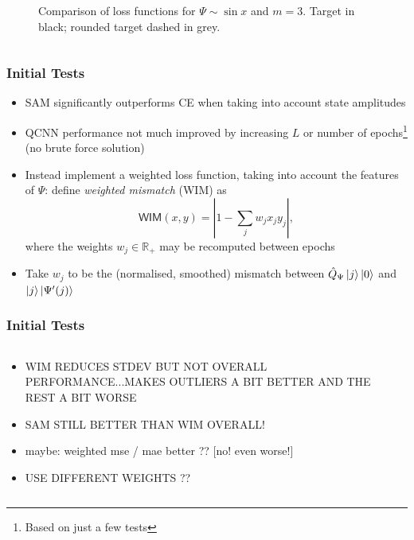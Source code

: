 \documentclass{beamer}
\begin{document}
\begin{frame}
\begin{columns}
\begin{column}{0.5\textwidth}
\begin{figure}[h]
\caption{Comparison of loss functions for $\Psi \sim \sin x$ and $m=3$. Target in black; rounded target dashed in grey.}
\end{figure}
\end{column}
\end{columns}
\end{frame}

\begin{frame}
\frametitle{Initial Tests}
\begin{itemize}
\item \alert{SAM} significantly \alert{outperforms CE} when taking into account state amplitudes 
\item QCNN performance not much improved by increasing $L$ or number of epochs\footnote{Based on just a few tests} (\alert{no brute force solution})
\item Instead implement a \alert{weighted loss function}, taking into account the features of $\Psi$: define \emph{weighted mismatch} (\alert{WIM}) as 
\begin{equation}
\mathsf{WIM}(x,y) =  \left\vert 1 - \sum_j w_j x_j y_j \right \vert, 
\end{equation}
where the weights $w_j \in \mathbb{R}_{+}$ may be recomputed between epochs
\item Take $w_j$ to be the (normalised, smoothed) mismatch between $\hat{Q}_\Psi \ket{j} \ket{0}$ and $\ket{j}\ket{\Psi'(j)}$
\end{itemize}
\end{frame}

\begin{frame}
\frametitle{Initial Tests}
\begin{columns}
\begin{column}{0.5\textwidth}
\begin{itemize}
\item WIM REDUCES STDEV BUT NOT OVERALL PERFORMANCE...MAKES OUTLIERS A BIT BETTER AND THE REST A BIT WORSE 
\item SAM STILL BETTER THAN WIM OVERALL!
\item maybe: weighted mse / mae better ?? [no! even worse!]
\item USE DIFFERENT WEIGHTS ??
\end{itemize}
\end{column}
\begin{column}{0.5\textwidth}

\end{column}
\end{columns}
\end{frame}
\end{document}
